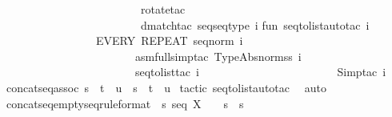 \begin{isabellebody}
\ \ \ \ \ \ \ \ \ \ \ \ \ \ \ \ \ \ \ \ \ \ \ \ \ {\isacharparenleft}rotate{\isacharunderscore}tac\ {\isachartilde}{}\ {}{\isacharparenright}{\isacharcomma}\isanewline
\ \ \ \ \ \ \ \ \ \ \ \ \ \ \ \ \ \ \ \ \ \ \ \ \ {\isacharparenleft}dmatch{\isacharunderscore}tac\ {\isacharbrackleft}seq{\isacharunderscore}seqtype{\isacharbrackright}\ i{\isacharparenright}{\isacharbrackright}\isanewline
\isanewline
\isanewline
fun\ seq{\isacharunderscore}to{\isacharunderscore}list{\isacharunderscore}auto{\isacharunderscore}tac\ i\ {\isacharequal}\isanewline
\ \ \ \ \ \ \ \ \ \ \ \ \ \ \ \ \ EVERY\ {\isacharbrackleft}REPEAT\ {\isacharparenleft}seq{\isacharunderscore}norm\ i{\isacharparenright}{\isacharcomma}\isanewline
\ \ \ \ \ \ \ \ \ \ \ \ \ \ \ \ \ \ \ \ \ \ \ \ {\isacharparenleft}asm{\isacharunderscore}full{\isacharunderscore}simp{\isacharunderscore}tac\ TypeAbs{\isacharunderscore}norm{\isacharunderscore}ss\ i{\isacharparenright}{\isacharcomma}\isanewline
\ \ \ \ \ \ \ \ \ \ \ \ \ \ \ \ \ \ \ \ \ \ \ \ {\isacharparenleft}seq{\isacharunderscore}to{\isacharunderscore}list{\isacharunderscore}tac\ i{\isacharparenright}{\isacharcomma}\isanewline
\ \ \ \ \ \ \ \ \ \ \ \ \ \ \ \ \ \ \ \ \ \ \ \ {\isacharparenleft}Simp{\isacharunderscore}tac\ i{\isacharparenright}{\isacharbrackright}\isanewline
\isanewline
\isanewline
{\isacharverbatimclose}%
\endisatagML
{\isafoldML}%
%
\isadelimML
\isanewline
%
\endisadelimML
\isanewline
\isanewline
\isanewline
\isanewline
\isanewline
\isanewline
\isanewline
\isanewline
{}\isamarkupfalse%
\ concatseq{\isacharunderscore}assoc{\isacharcolon}\ {\isachardoublequoteopen}s\ {\isacharpercent}{\isacharampersand}{\isacharcircum}\ t\ {\isacharpercent}{\isacharampersand}{\isacharcircum}\ u\ {\isacharequal}\ s\ {\isacharpercent}{\isacharampersand}{\isacharcircum}\ {\isacharparenleft}t\ {\isacharpercent}{\isacharampersand}{\isacharcircum}\ u{\isacharparenright}{\isachardoublequoteclose}\isanewline
%
\isadelimproof
%
\endisadelimproof
%
\isatagproof
{}\isamarkupfalse%
\ {\isacharparenleft}tactic\ {\isacharverbatimopen}seq{\isacharunderscore}to{\isacharunderscore}list{\isacharunderscore}auto{\isacharunderscore}tac\ {}{\isacharverbatimclose}{\isacharparenright}\isanewline
{}\isamarkupfalse%
\ auto\isanewline
{}\isamarkupfalse%
%
\endisatagproof
{\isafoldproof}%
%
\isadelimproof
\isanewline
%
\endisadelimproof
\isanewline
{}\isamarkupfalse%
\ concatseq{\isacharunderscore}emptyseq{\isacharbrackleft}rule{\isacharunderscore}format{\isacharbrackright}\ {\isacharcolon}\ {\isachardoublequoteopen}s\ {\isacharcolon}seq\ X\ {\isacharminus}{\isacharminus}{\isachargreater}\ {\isacharpercent}{\isacharless}{\isacharpercent}{\isachargreater}\ {\isacharpercent}{\isacharampersand}{\isacharcircum}\ s\ {\isacharequal}\ s{\isachardoublequoteclose}\isanewline

\end{isabellebody}
